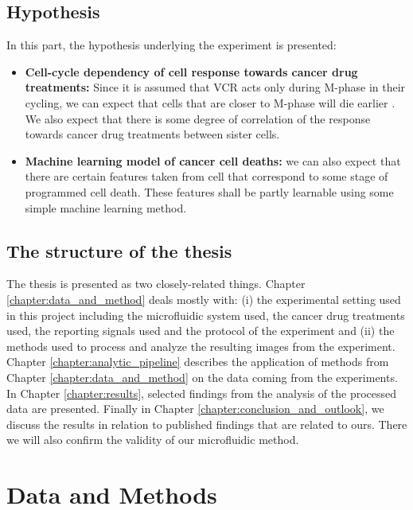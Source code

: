 \documentclass[pdftex,12pt,a4paper]{report}
\begin{document}
\section{Hypothesis}

In this part, the hypothesis underlying the experiment is presented:

\begin{itemize}
\item \textbf{Cell-cycle dependency of cell response towards cancer drug  treatments:} Since it is assumed that VCR acts only during M-phase in their cycling, we can expect that cells that are closer to M-phase will die earlier \cite{gascoigne2008cancer, holland2008beyond}. We also expect that there is some degree of correlation of the response towards cancer drug treatments between sister cells.
\item \textbf{Machine learning model of cancer cell deaths:} we can also expect that there are certain features taken from cell that correspond to some stage of programmed cell death.  These features shall be partly learnable using some simple machine learning method.
\end{itemize}


\section{The structure of the thesis}


The thesis is presented as two closely-related things. Chapter \ref{chapter:data_and_method} deals mostly with: (i) the experimental setting used in this project including the microfluidic system used, the cancer drug treatments used, the reporting signals used and the protocol of the experiment and (ii) the methods used to process and analyze the resulting images from the experiment. Chapter \ref{chapter:analytic_pipeline} describes the application of methods from Chapter \ref{chapter:data_and_method} on the data coming from the experiments. In Chapter \ref{chapter:results}, selected findings from the analysis of the processed data are presented. Finally in Chapter \ref{chapter:conclusion_and_outlook}, we discuss the results in relation to published findings that are related to ours. There we will also confirm the validity of our microfluidic method.

\chapter{Data and Methods}
\end{document}
